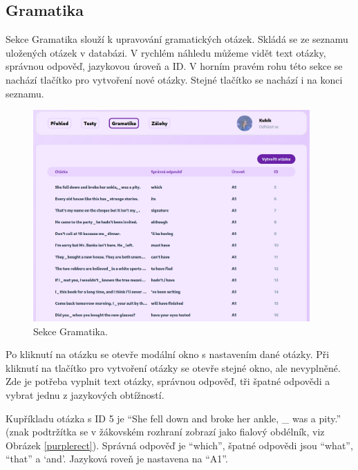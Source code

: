 \pagebreak
\subsection{Gramatika}

Sekce Gramatika slouží k upravování gramatických otázek. Skládá se ze seznamu uložených otázek v databázi. V rychlém náhledu můžeme vidět text otázky, správnou odpověď, jazykovou úroveň a ID. V horním pravém rohu této sekce se nachází tlačítko pro vytvoření nové otázky. Stejné tlačítko se nachází i na konci seznamu.

\begin{figure}[H]
    \centering
    \includegraphics[width=400px]{images/01design/grammar.png}
    \caption{Sekce Gramatika.}
\end{figure}

Po kliknutí na otázku se otevře modální okno s nastavením dané otázky. Při kliknutí na tlačítko pro vytvoření otázky se otevře stejné okno, ale nevyplněné. Zde je potřeba vyplnit text otázky, správnou odpověď, tři špatné odpovědi a vybrat jednu z jazykových obtížností. 

Kupříkladu otázka s ID 5 je \enquote{She fell down and broke her ankle, \_ was a pity.} (znak podtržítka se v žákovském rozhraní zobrazí jako fialový obdélník, viz Obrázek \ref{purplerect}). Správná odpověď je \enquote{which}, špatné odpovědi jsou \enquote{what}, \enquote{that} a \enquote*{and}. Jazyková roveň je nastavena na \enquote{A1}.

